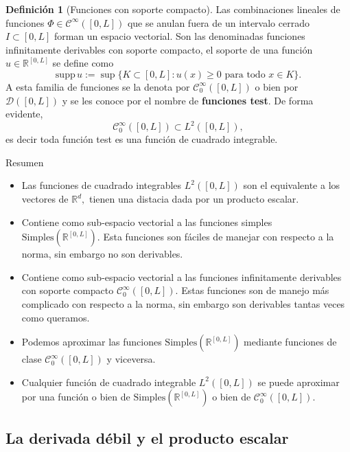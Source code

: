 \documentclass[10pt,handout]{beamer}
\theoremstyle{plain} %
\theoremstyle{plain} %
\theoremstyle{plain} %
\theoremstyle{plain} %
\theoremstyle{definition}
\newtheorem{defn}{Definici\'on}
\theoremstyle{example}
\theoremstyle{example}
\theoremstyle{remark}
\theoremstyle{remark}
\begin{document}
\begin{frame}
\begin{defn}[Funciones con soporte compacto]
Las combinaciones lineales de funciones $\Phi \in \mathcal{C}^{\infty}([0,L])$ que se anulan fuera de un intervalo cerrado $I \subset [0,L]$ forman un espacio vectorial. Son las denominadas funciones infinitamente derivables con soporte compacto, el soporte de una función $u \in \mathbb{R}^{[0,L]}$ se define como
$$
\mathrm{supp}\, u :=  \sup \{K \subset [0,L]: u(x) \ge 0 \text{ para todo } x \in K \}.
$$
A esta familia de funciones se la denota por $\mathcal{C}_0^{\infty}([0,L])$ o bien por
$\mathcal{D}([0,L])$ y se les conoce por el nombre de \textbf{funciones test}. De forma evidente,
$$
\mathcal{C}_0^{\infty}([0,L]) \subset L^2([0,L]),
$$
es decir toda función test es una función de cuadrado integrable.
\end{defn}
\end{frame}

\begin{frame}{Resumen}
\begin{itemize}
\item Las funciones de cuadrado integrables $L^2([0,L])$ son el equivalente a los vectores de $\mathbb{R}^d,$ tienen una distacia dada por un producto escalar.
\item Contiene como sub-espacio vectorial a las funciones simples $\mathrm{Simples}(\mathbb{R}^{[0,L]}).$ Esta funciones son fáciles de manejar con respecto a la norma, sin embargo no son derivables.
\item Contiene como sub-espacio vectorial a las funciones infinitamente derivables con soporte compacto $\mathcal{C}_0^{\infty}([0,L]).$ Estas funciones son de manejo más complicado con respecto a la norma, sin embargo son derivables tantas veces como queramos.
\item Podemos aproximar las funciones $\mathrm{Simples}(\mathbb{R}^{[0,L]})$  mediante funciones
de clase $\mathcal{C}_0^{\infty}([0,L])$ y viceversa.
\item Cualquier función de cuadrado integrable $L^2([0,L])$ se puede aproximar por una función o bien de $\mathrm{Simples}(\mathbb{R}^{[0,L]})$ o bien de $\mathcal{C}_0^{\infty}([0,L]).$
\end{itemize}
\end{frame}

\subsection{La derivada débil y el producto escalar}
\end{document}
